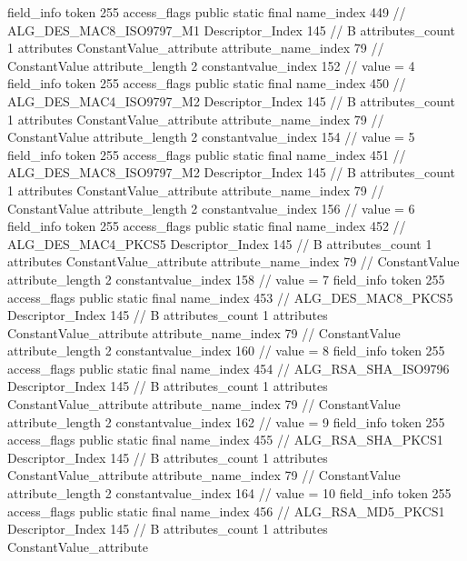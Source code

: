 {{{{{{{				}
				}
			}
			field_info {
				token	255
				access_flags	public static final
				name_index	449		// ALG_DES_MAC8_ISO9797_M1
				Descriptor_Index	145		// B
				attributes_count	1
				attributes {
				ConstantValue_attribute {
					attribute_name_index	79		// ConstantValue
					attribute_length	2
					constantvalue_index	152		// value = 4
				}
				}
			}
			field_info {
				token	255
				access_flags	public static final
				name_index	450		// ALG_DES_MAC4_ISO9797_M2
				Descriptor_Index	145		// B
				attributes_count	1
				attributes {
				ConstantValue_attribute {
					attribute_name_index	79		// ConstantValue
					attribute_length	2
					constantvalue_index	154		// value = 5
				}
				}
			}
			field_info {
				token	255
				access_flags	public static final
				name_index	451		// ALG_DES_MAC8_ISO9797_M2
				Descriptor_Index	145		// B
				attributes_count	1
				attributes {
				ConstantValue_attribute {
					attribute_name_index	79		// ConstantValue
					attribute_length	2
					constantvalue_index	156		// value = 6
				}
				}
			}
			field_info {
				token	255
				access_flags	public static final
				name_index	452		// ALG_DES_MAC4_PKCS5
				Descriptor_Index	145		// B
				attributes_count	1
				attributes {
				ConstantValue_attribute {
					attribute_name_index	79		// ConstantValue
					attribute_length	2
					constantvalue_index	158		// value = 7
				}
				}
			}
			field_info {
				token	255
				access_flags	public static final
				name_index	453		// ALG_DES_MAC8_PKCS5
				Descriptor_Index	145		// B
				attributes_count	1
				attributes {
				ConstantValue_attribute {
					attribute_name_index	79		// ConstantValue
					attribute_length	2
					constantvalue_index	160		// value = 8
				}
				}
			}
			field_info {
				token	255
				access_flags	public static final
				name_index	454		// ALG_RSA_SHA_ISO9796
				Descriptor_Index	145		// B
				attributes_count	1
				attributes {
				ConstantValue_attribute {
					attribute_name_index	79		// ConstantValue
					attribute_length	2
					constantvalue_index	162		// value = 9
				}
				}
			}
			field_info {
				token	255
				access_flags	public static final
				name_index	455		// ALG_RSA_SHA_PKCS1
				Descriptor_Index	145		// B
				attributes_count	1
				attributes {
				ConstantValue_attribute {
					attribute_name_index	79		// ConstantValue
					attribute_length	2
					constantvalue_index	164		// value = 10
				}
				}
			}
			field_info {
				token	255
				access_flags	public static final
				name_index	456		// ALG_RSA_MD5_PKCS1
				Descriptor_Index	145		// B
				attributes_count	1
				attributes {
				ConstantValue_attribute {
}}}}}}}
